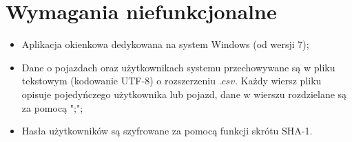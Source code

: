 \section{Wymagania niefunkcjonalne}
\begin{itemize}
    \item Aplikacja okienkowa dedykowana na system Windows (od wersji 7);
    \item Dane o pojazdach oraz użytkownikach systemu przechowywane są w pliku tekstowym (kodowanie UTF-8) o
    rozszerzeniu $.csv$.
    Każdy wiersz pliku opisuje pojedyńczego użytkownika lub pojazd, dane w wierszu rozdzielane są za pomocą ";";
    \item Hasła użytkowników są szyfrowane za pomocą funkcji skrótu SHA-1.
\end{itemize}